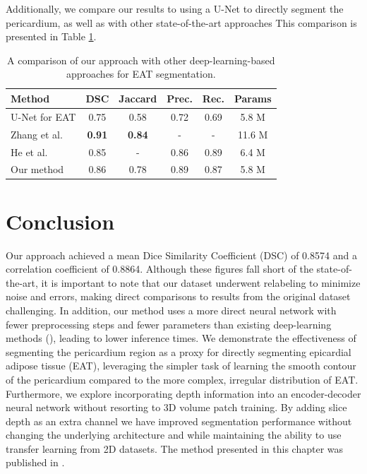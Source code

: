 Additionally, we compare our results to using a U-Net to directly segment the pericardium, as well as with other state-of-the-art approaches This comparison is presented in Table \ref{tab:comparison}.

\begin{table}[t!]
\renewcommand{\arraystretch}{1.4}
\caption{A comparison of our approach with other deep-learning-based approaches for EAT segmentation.}
\centering
\begin{tabularx}{\textwidth}{Xccccc} 
 Method & DSC & Jaccard & Prec. & Rec. & Params \\
 \hline
 U-Net for EAT & 0.75 & 0.58 & 0.72 & 0.69 & 5.8 M \\ 
 Zhang et al. \cite{Zhang2020} & \textbf{0.91} & \textbf{0.84} & - & - & 11.6 M \\
 He et al. \cite{he2020} & 0.85 & - & 0.86 & 0.89 & 6.4 M \\
 Our method & 0.86 & 0.78 & 0.89 & 0.87 & 5.8 M \\
\end{tabularx}
\label{tab:comparison}
\end{table}

\section{Conclusion}\label{conclusion}

Our approach achieved a mean Dice Similarity Coefficient (DSC) of 0.8574 and a correlation coefficient of 0.8864. Although these figures fall short of the state-of-the-art, it is important to note that our dataset underwent relabeling to minimize noise and errors, making direct comparisons to results from the original dataset challenging. In addition, our method uses a more direct neural network with fewer preprocessing steps and fewer parameters than existing deep-learning methods (\cite{Commandeur2018, Li2019, he2020}), leading to lower inference times.  We demonstrate the effectiveness of segmenting the pericardium region as a proxy for directly segmenting epicardial adipose tissue (EAT), leveraging the simpler task of learning the smooth contour of the pericardium compared to the more complex, irregular distribution of EAT. Furthermore, we explore incorporating depth information into an encoder-decoder neural network without resorting to 3D volume patch training. By adding slice depth as an extra channel we have improved segmentation performance without changing the underlying architecture and while maintaining the ability to use transfer learning from 2D datasets. The method presented in this chapter was published in \cite{bencevicEpicardialAdiposeTissue2021}.
